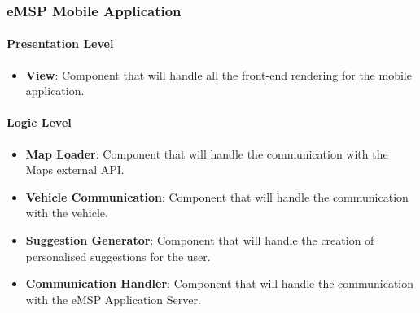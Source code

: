 \subsubsection{eMSP Mobile Application}
\label{applicationView}
\paragraph{Presentation Level}
\begin{itemize}
    \item \textbf{View}: Component that will handle all the front-end rendering for the mobile application.
\end{itemize}
\paragraph{Logic Level}
\begin{itemize}
    \item \textbf{Map Loader}: Component that will handle the communication with the Maps external API.
    \item \textbf{Vehicle Communication}: Component that will handle the communication with the vehicle.
    \item \textbf{Suggestion Generator}: Component that will handle the creation of personalised suggestions for the user.
    \item \textbf{Communication Handler}: Component that will handle the communication with the eMSP Application Server.
\end{itemize}
